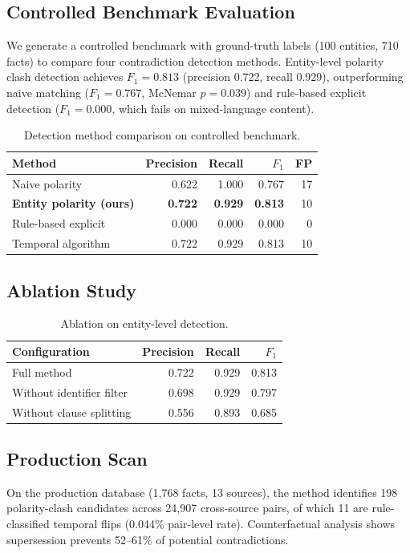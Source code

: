 \documentclass{article}
\begin{document}
\subsection{Controlled Benchmark Evaluation}
We generate a controlled benchmark with ground-truth labels (100 entities, 710 facts) to compare four contradiction detection methods. Entity-level polarity clash detection achieves $F_1 = 0.813$ (precision 0.722, recall 0.929), outperforming naive matching ($F_1 = 0.767$, McNemar $p = 0.039$) and rule-based explicit detection ($F_1 = 0.000$, which fails on mixed-language content).

\begin{table}[h]
\centering
\caption{Detection method comparison on controlled benchmark.}
\begin{tabular}{lrrrr}
\toprule
Method & Precision & Recall & $F_1$ & FP \\
\midrule
Naive polarity & 0.622 & 1.000 & 0.767 & 17 \\
\textbf{Entity polarity (ours)} & \textbf{0.722} & \textbf{0.929} & \textbf{0.813} & 10 \\
Rule-based explicit & 0.000 & 0.000 & 0.000 & 0 \\
Temporal algorithm & 0.722 & 0.929 & 0.813 & 10 \\
\bottomrule
\end{tabular}
\label{tab:detectors}
\end{table}

\subsection{Ablation Study}

\begin{table}[h]
\centering
\caption{Ablation on entity-level detection.}
\begin{tabular}{lrrr}
\toprule
Configuration & Precision & Recall & $F_1$ \\
\midrule
Full method & 0.722 & 0.929 & 0.813 \\
Without identifier filter & 0.698 & 0.929 & 0.797 \\
Without clause splitting & 0.556 & 0.893 & 0.685 \\
\bottomrule
\end{tabular}
\label{tab:cac-ablation}
\end{table}

\subsection{Production Scan}
On the production database (1{,}768 facts, 13 sources), the method identifies 198 polarity-clash candidates across 24{,}907 cross-source pairs, of which 11 are rule-classified temporal flips (0.044\% pair-level rate). Counterfactual analysis shows supersession prevents 52--61\% of potential contradictions.
\end{document}
